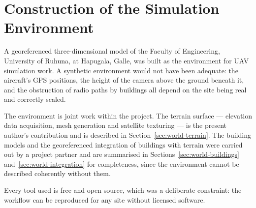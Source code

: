 %      
%
%
%

\section{Construction of the Simulation Environment}
\label{sec:world}

A georeferenced three-dimensional model of the Faculty of Engineering,
University of Ruhuna, at Hapugala, Galle, was built as the environment for
UAV simulation work. A synthetic environment would not have been adequate:
the aircraft's GPS positions, the height of the camera above the ground
beneath it, and the obstruction of radio paths by buildings all depend on the
site being real and correctly scaled.

The environment is joint work within the project. The terrain surface ---
elevation data acquisition, mesh generation and satellite texturing --- is
the present author's contribution and is described in
Section~\ref{sec:world-terrain}. The building models and the georeferenced
integration of buildings with terrain were carried out by a project partner
and are summarised in Sections~\ref{sec:world-buildings}
and~\ref{sec:world-integration} for completeness, since the environment
cannot be described coherently without them.

Every tool used is free and open source, which was a deliberate constraint:
the workflow can be reproduced for any site without licensed software.


